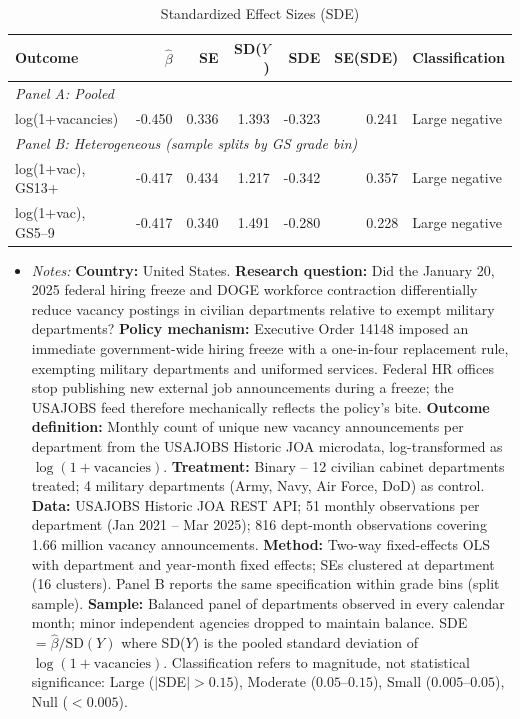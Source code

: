 \begin{table}[!ht]
\centering
\caption{Standardized Effect Sizes (SDE)}
\label{tab:sde}
\small
\begin{tabular}{lrrrrrl}
\toprule
Outcome & $\hat{\beta}$ & SE & SD($Y$) & SDE & SE(SDE) & Classification \\
\midrule
\multicolumn{7}{l}{\textit{Panel A: Pooled}} \\
log(1+vacancies) & -0.450 & 0.336 & 1.393 & -0.323 & 0.241 & Large negative \\
\midrule
\multicolumn{7}{l}{\textit{Panel B: Heterogeneous (sample splits by GS grade bin)}} \\
log(1+vac), GS13+ & -0.417 & 0.434 & 1.217 & -0.342 & 0.357 & Large negative \\
log(1+vac), GS5--9 & -0.417 & 0.340 & 1.491 & -0.280 & 0.228 & Large negative \\
\bottomrule
\end{tabular}
\begin{minipage}{0.97\textwidth}
\footnotesize
\begin{itemize}
 \item \textit{Notes:} \textbf{Country:} United States. \textbf{Research question:} Did the January 20, 2025 federal hiring freeze and DOGE workforce contraction differentially reduce vacancy postings in civilian departments relative to exempt military departments? \textbf{Policy mechanism:} Executive Order 14148 imposed an immediate government-wide hiring freeze with a one-in-four replacement rule, exempting military departments and uniformed services. Federal HR offices stop publishing new external job announcements during a freeze; the USAJOBS feed therefore mechanically reflects the policy's bite. \textbf{Outcome definition:} Monthly count of unique new vacancy announcements per department from the USAJOBS Historic JOA microdata, log-transformed as $\log(1+\text{vacancies})$. \textbf{Treatment:} Binary -- 12 civilian cabinet departments treated; 4 military departments (Army, Navy, Air Force, DoD) as control. \textbf{Data:} USAJOBS Historic JOA REST API; 51 monthly observations per department (Jan 2021 -- Mar 2025); 816 dept-month observations covering 1.66 million vacancy announcements. \textbf{Method:} Two-way fixed-effects OLS with department and year-month fixed effects; SEs clustered at department (16 clusters). Panel B reports the same specification within grade bins (split sample). \textbf{Sample:} Balanced panel of departments observed in every calendar month; minor independent agencies dropped to maintain balance. SDE $= \hat{\beta} / \text{SD}(Y)$ where SD($Y$) is the pooled standard deviation of $\log(1+\text{vacancies})$. Classification refers to magnitude, not statistical significance: Large ($|$SDE$| > 0.15$), Moderate ($0.05$--$0.15$), Small ($0.005$--$0.05$), Null ($< 0.005$). 
\end{itemize}
\end{minipage}
\end{table}
